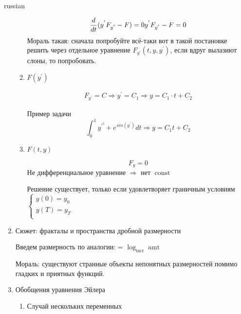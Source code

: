 \documentclass{article}
\begin{document}
\begin{otherlanguage*}{russian}
\begin{enumerate}
\begin{enumerate}
\begin{equation}
\frac{d}{dt} (y^{'} F_{y^{'}} - F) = 0 \\ 
y^{'} F_{y^{'}} - F = 0 
\end{equation}
Мораль такая: сначала попробуйте всё-таки вот в такой постановке решить через отдельное уравнение $ F_{y^{'}} (t, y, y^{'}) $, если вдруг вылазиют слоны, то попробовать. 

\item $ F(y^{'}) $ 

\begin{align}
F_{y^{'}} = C \Rightarrow y^{'} = C_1 \Rightarrow y = C_1 \cdot t + C_2 
\end{align}

Пример задачи 
\begin{equation}
\int_0^1 y^{'^{5}} + e^{sin(y^{'})} dt \Rightarrow y = C_1 t + C_2 
\end{equation}

\item $ F(t, y) $

\begin{equation}
F_y = 0 
\end{equation}
Не дифференциальное уравнение $ \Rightarrow $ нет $ \operatorname{const} $ 

Решение существует, только если удовлетворяет граничным условиям $ 
\begin{cases} 
y(0) = y_0 \\ 
y(T) = y_T \\
\end{cases}$ 
\end{enumerate}
\item Сюжет: фракталы и пространства дробной размерности 

Введем размерность по аналогии: = $ \log_{\operatorname{incr}} \operatorname{amt}$ 

Мораль: существуют странные объекты непонятных размерностей помимо гладких и приятных функций. 

\item Обобщения уравнения Эйлера 
\begin{enumerate}
\item Случай нескольких переменных 


\end{enumerate}
\end{enumerate}
\end{otherlanguage*}
\end{document}

